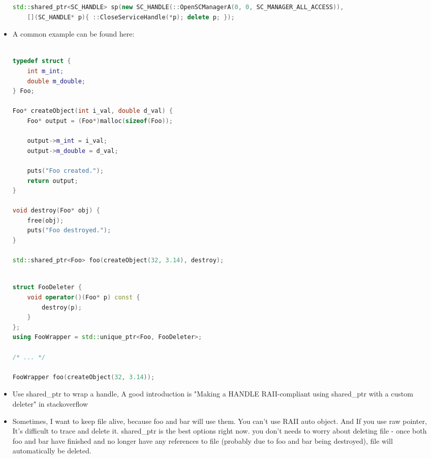 \documentclass[a4paper,12pt,twoside]{book}
\begin{document}
\begin{itemize}
\begin{lstlisting}[frame=single, language=c++]
std::shared_ptr<SC_HANDLE> sp(new SC_HANDLE(::OpenSCManagerA(0, 0, SC_MANAGER_ALL_ACCESS)),
    [](SC_HANDLE* p){ ::CloseServiceHandle(*p); delete p; });
\end{lstlisting}

\item A common example can be found here:

\begin{lstlisting}[frame=single, language=c++]

typedef struct {
    int m_int;
    double m_double;
} Foo;

Foo* createObject(int i_val, double d_val) {
    Foo* output = (Foo*)malloc(sizeof(Foo));

    output->m_int = i_val;
    output->m_double = d_val;

    puts("Foo created.");
    return output;
}

void destroy(Foo* obj) {
    free(obj);
    puts("Foo destroyed.");        
}

std::shared_ptr<Foo> foo(createObject(32, 3.14), destroy);

\end{lstlisting}



\begin{lstlisting}[frame=single, language=c++]

struct FooDeleter {
    void operator()(Foo* p) const {
        destroy(p);
    }
};
using FooWrapper = std::unique_ptr<Foo, FooDeleter>;

/* ... */

FooWrapper foo(createObject(32, 3.14));

\end{lstlisting}


\item Use shared\_ptr to wrap a handle, A good introduction is "Making a HANDLE RAII-compliant using shared\_ptr with a custom deleter" in stackoverflow


\item Sometimes, I want to keep file alive, because foo and bar will use them. You can't use RAII auto object. And If you use raw pointer, It's difficult to trace and delete it. shared\_ptr is the best options right now.  you don't needs to worry about deleting file - once both foo and bar have finished and no longer have any references to file (probably due to foo and bar being destroyed), file will automatically be deleted.


\end{itemize}
\end{document}
